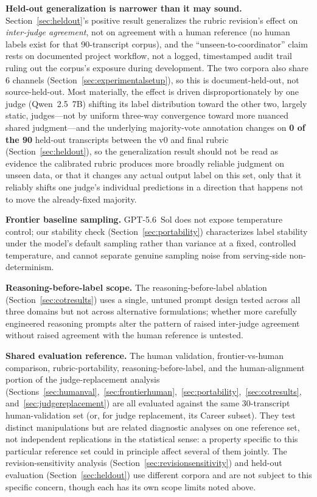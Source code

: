 \documentclass[11pt]{article}
\begin{document}
\textbf{Held-out generalization is narrower than it may sound.}
Section~\ref{sec:heldout}'s positive result generalizes the rubric
revision's effect on \emph{inter-judge agreement}, not on agreement with a
human reference (no human labels exist for that 90-transcript corpus), and
the ``unseen-to-coordinator'' claim rests on documented project workflow,
not a logged, timestamped audit trail ruling out the corpus's exposure
during development. The two corpora also share 6 channels
(Section~\ref{sec:experimentalsetup}), so this is document-held-out, not
source-held-out. Most materially, the effect is driven disproportionately
by one judge (Qwen~2.5~7B) shifting its label distribution toward the
other two, largely static, judges---not by uniform three-way convergence
toward more nuanced shared judgment---and the underlying majority-vote
annotation changes on \textbf{0 of the 90} held-out transcripts between
the v0 and final rubric (Section~\ref{sec:heldout}), so the generalization
result should not be read as evidence the calibrated rubric produces more
broadly reliable judgment on unseen data, or that it changes any actual
output label on this set, only that it reliably shifts one judge's
individual predictions in a direction that happens not to move the
already-fixed majority.

\textbf{Frontier baseline sampling.} GPT-5.6~Sol does not expose temperature
control; our stability check (Section~\ref{sec:portability}) characterizes
label stability under the model's default sampling rather than variance at
a fixed, controlled temperature, and cannot separate genuine sampling noise
from serving-side non-determinism.

\textbf{Reasoning-before-label scope.} The reasoning-before-label ablation
(Section~\ref{sec:cotresults}) uses a single, untuned prompt design tested
across all three domains but not across alternative formulations; whether
more carefully engineered reasoning prompts alter the pattern of raised
inter-judge agreement without raised agreement with the human reference is
untested.

\textbf{Shared evaluation reference.} The human validation, frontier-vs-human
comparison, rubric-portability, reasoning-before-label, and the
human-alignment portion of the judge-replacement analysis
(Sections~\ref{sec:humanval},~\ref{sec:frontierhuman},~\ref{sec:portability},~\ref{sec:cotresults},
and~\ref{sec:judgereplacement}) are all evaluated against the same
30-transcript human-validation set (or, for judge replacement, its Career
subset). They test distinct manipulations but are related diagnostic
analyses on one reference set, not independent replications in the
statistical sense: a property specific to this particular reference set
could in principle affect several of them jointly. The revision-sensitivity
analysis (Section~\ref{sec:revisionsensitivity}) and held-out evaluation
(Section~\ref{sec:heldout}) use different corpora and are not subject to
this specific concern, though each has its own scope limits noted above.
\end{document}
